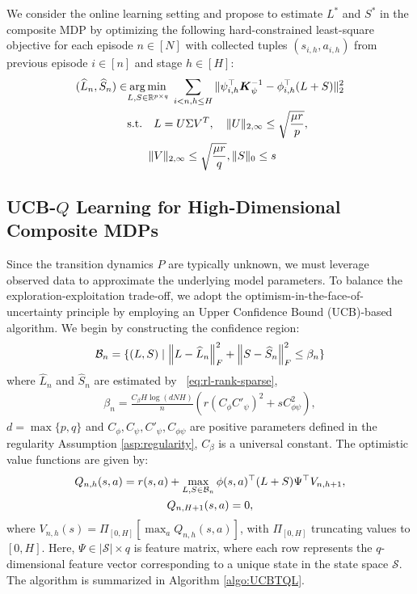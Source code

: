 We consider the online learning setting and propose to estimate $L^*$ and $S^*$ in the composite MDP by optimizing the following hard-constrained least-square objective for each episode $n\in[N]$ with collected tuples $(s_{i,h},a_{i,h})$ from previous episode $i\in[n]$ and stage $h\in[H]$:
\begin{equation}
\begin{aligned}
(\widehat{L}_n, \widehat{S}_n) \in 
&\underset{L, S \in \mathbb{R}^{p \times q}}{\arg\min}\;  \sum_{i < n, h \leq H} \| \psi_{i,h}^\top \boldsymbol{K}_{\psi}^{-1} -\phi_{i,h}^\top (L + S) \|_2^2  \\
&\text{s.t.}\quad L = U\Sigma V^T, \quad \|U\|_{2,\infty} \leq \sqrt{\frac{\mu r}{p}}, \\
&\hspace{2ex} \quad \|V\|_{2,\infty} \leq \sqrt{\frac{\mu r}{q}}, \|S\|_{0}\le s
\end{aligned}
\label{eq:rl-rank-sparse}
\end{equation}

\subsection{UCB-$Q$ Learning for High-Dimensional Composite MDPs}
Since the transition dynamics $P$ are typically unknown, we must leverage observed data to approximate the underlying model parameters.
To balance the exploration-exploitation trade-off, we adopt the optimism-in-the-face-of-uncertainty principle by employing an Upper Confidence Bound (UCB)-based algorithm.
We begin by constructing the confidence region:
\begin{align}
\label{def:confidence-region}
\mathcal{B}_n=\{( L, S) \mid \left\lVert L-\widehat L_n\right\rVert_F^2+\left\lVert S-\widehat S_n\right\rVert_F^2\leq \beta_n\}\end{align}
where $\hat L_n$ and $\hat S_n$ are estimated by ~\eqref{eq:rl-rank-sparse}, 
\begin{align} \label{def:beta_n}
\beta_{n}=\frac{C_\beta H\log(dNH)}{n}\left(r(C_\phi C'_{\psi})^2 +sC_{\phi\psi}^2\right), 
\end{align}
$d=\max\{p, q\}$ and $C_\phi,C_\psi,C'_\psi,C_{\phi\psi}$ are positive parameters defined in the regularity Assumption \ref{asp:regularity}, $C_\beta$ is a universal constant.
The optimistic value functions are given by:
\begin{gather}
\label{eq:updateQ}
Q_{n, h}(s, a) = r(s, a) + \max_{ L, S\in{\cal B}_n}\phi(s, a)^{\top} ( L+ S)  \Psi^{\top} V_{n, h+1}, \\
Q_{n, H+1}(s, a) = 0,  
\nonumber
\end{gather}
where $V_{n, h}(s)=\Pi_{[0, H]}\left[\max _{a} Q_{n, h}(s, a)\right]$, with $\Pi_{[0, H]}$ truncating values to $[0, H]$.
Here, $\Psi \in |\mathcal{S}| \times q$ is feature matrix, where each row represents the  $q$-dimensional feature vector corresponding to a unique state in the state space $\mathcal{S}$.
The algorithm is summarized in Algorithm \ref{algo:UCBTQL}. 

